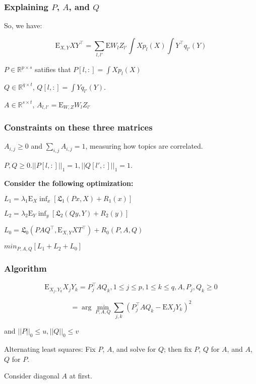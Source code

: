 \documentclass{beamer}
\begin{document}
\begin{frame}
\frametitle{Explaining $P$, $A$, and $Q$}
So, we have:

\begin{equation}
\text{E}_{X, Y}{XY^\top}=\sum_{l,l'}{\text{E} W_l Z_{l'} \int X p_l(X) \int Y^\top q_{l'}(Y)}
\end{equation}

$P \in \mathbb{R}^{p \times s}$ satifies that $P[l,:]=\int X p_l (X)$

$Q \in \mathbb{R}^{q \times t}$, $Q[l,:]=\int Y q_{l'} (Y)$.

$A \in \mathbb{R}^{s \times t}$, $A_{l, l'}=\text{E}_{W,Z}{W_l Z_{l'}}$
\end{frame}

\begin{frame}
\frametitle{Constraints on these three matrices}
$A_{i,j} \ge 0$ and $\sum_{i,j}A_{i,j}=1$, measuring how topics are correlated.

$P, Q \ge 0. ||P[l,:]||_1 = 1, ||Q[l',:]||_1=1$.

\textbf{Consider the following optimization:}


$L_1 = \lambda_1 \text{E}_X \inf_x{[\mathfrak{L}_1(Px,X)+R_1(x)]}$

$L_2 = \lambda_2 \text{E}_Y \inf_y{[\mathfrak{L}_2(Qy,Y)+R_2(y)]}$

$L_0 = \mathfrak{L}_0(PAQ^\top, \text{E}_{X,Y}{XT^\top}) + R_0(P,A,Q)$

$min_{P, A, Q}{[ L_1 + L_2 + L_0 ]}$
\end{frame}

\begin{frame}
\frametitle{Algorithm}
\begin{equation}
\text{E}_{X_j,Y_k}{X_j Y_k} = P^\top_j A Q_k, 1\le j \le p, 1 \le k \le q, A, P_j, Q_k \ge 0
\end{equation}

\begin{equation}
[P, A, Q] = \arg \min_{P, A, Q} \sum_{j,k}(P_j^\top A Q_k - \text{E}X_j Y_k)^2
\end{equation}

and $||P||_0 \le u, ||Q||_0 \le v$

Alternating least squares: Fix $P$, $A$, and solve for $Q$; then fix $P$, $Q$ for $A$, and $A$, $Q$ for $P$.

Consider diagonal $A$ at first.

\end{frame}
\end{document}
